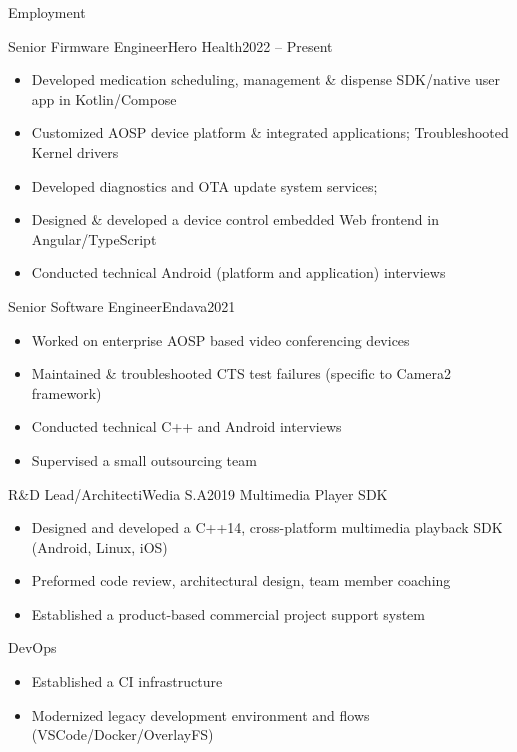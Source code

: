 \documentclass[]{mcdowellcv}
\begin{document}
	\makeheader

	\begin{cvsection}{Employment}
		\begin{cvsubsection}{Senior Firmware Engineer}{Hero Health}{2022 -- Present}
			\begin{itemize}
				\item Developed medication scheduling, management \& dispense SDK/native user app in Kotlin/Compose
				\item Customized AOSP device platform \& integrated applications; Troubleshooted Kernel drivers
				\item Developed diagnostics and OTA update system services;
				\item Designed \& developed a device control embedded Web frontend in Angular/TypeScript
				\item Conducted technical Android (platform and application) interviews
			\end{itemize}
		\end{cvsubsection}

		\begin{cvsubsection}{Senior Software Engineer}{Endava}{2021}
			\begin{itemize}
				\item Worked on enterprise AOSP based video conferencing devices
				\item Maintained \& troubleshooted CTS test failures (specific to Camera2 framework)
				\item Conducted technical C++ and Android interviews
				\item Supervised a small outsourcing team
			\end{itemize}
		\end{cvsubsection}

		\begin{cvsubsection}{R\&D Lead/Architect}{iWedia S.A}{2019}
			Multimedia Player SDK
			\begin{itemize}
				\item Designed and developed a C++14, cross-platform multimedia playback SDK (Android, Linux, iOS)
				\item Preformed code review, architectural design, team member coaching
				\item Established a product-based commercial project support system
			\end{itemize}
			DevOps
			\begin{itemize}
				\item Established a CI infrastructure
				\item Modernized legacy development environment and flows (VSCode/Docker/OverlayFS)
			\end{itemize}
		\end{cvsubsection}


\end{cvsection}
\end{document}

